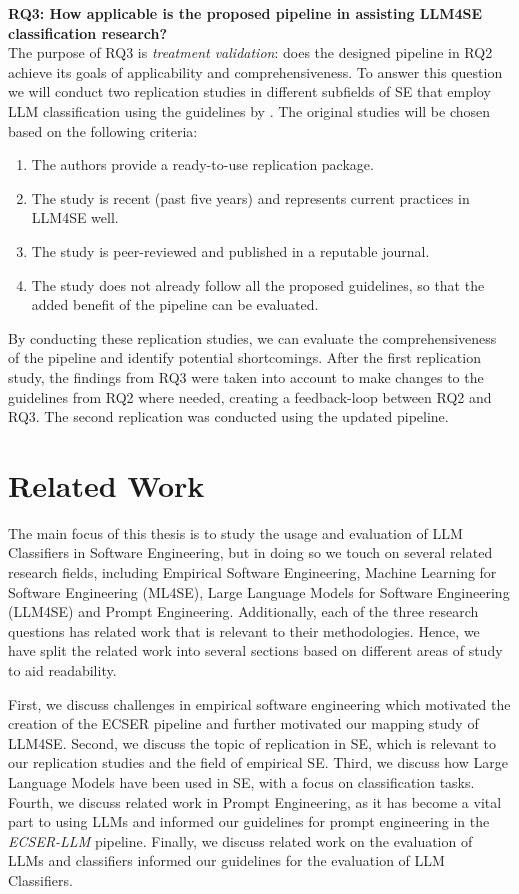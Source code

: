 \documentclass[a4paper]{article}
\newcommand{\emphasize}[1]{\textbf{#1}}
\newcommand{\newecser}{\textit{ECSER-LLM} }
\begin{document}
\emphasize{RQ3: How applicable is the proposed pipeline in assisting LLM4SE classification research?}\\
The purpose of RQ3 is \textit{treatment validation}: does the designed pipeline in RQ2 achieve its goals of applicability and comprehensiveness. To answer this question we will conduct two replication studies in different subfields of SE that employ LLM classification using the guidelines by \textcite{carver2010}. The original studies will be chosen based on the following criteria:
\begin{enumerate}
    \item The authors provide a ready-to-use replication package.
    \item The study is recent (past five years) and represents current practices in LLM4SE well.
    \item The study is peer-reviewed and published in a reputable journal.
    \item The study does not already follow all the proposed guidelines, so that the added benefit of the pipeline can be evaluated.
\end{enumerate}

By conducting these replication studies, we can evaluate the comprehensiveness of the pipeline and identify potential shortcomings. After the first replication study, the findings from RQ3 were taken into account to make changes to the guidelines from RQ2 where needed, creating a feedback-loop between RQ2 and RQ3. The second replication was conducted using the updated pipeline.

\section{Related Work} \label{Related Work}
The main focus of this thesis is to study the usage and evaluation of LLM Classifiers in Software Engineering, but in doing so we touch on several related research fields, including Empirical Software Engineering, Machine Learning for Software Engineering (ML4SE), Large Language Models for Software Engineering (LLM4SE) and Prompt Engineering. Additionally, each of the three research questions has related work that is relevant to their methodologies. Hence, we have split the related work into several sections based on different areas of study to aid readability. 

First, we discuss challenges in empirical software engineering which motivated the creation of the ECSER pipeline and further motivated our mapping study of LLM4SE. Second, we discuss the topic of replication in SE, which is relevant to our replication studies and the field of empirical SE. Third, we discuss how Large Language Models have been used in SE, with a focus on classification tasks. Fourth, we discuss related work in Prompt Engineering, as it has become a vital part to using LLMs and informed our guidelines for prompt engineering in the \newecser pipeline. Finally, we discuss related work on the evaluation of LLMs and classifiers informed our guidelines for the evaluation of LLM Classifiers.
\end{document}
